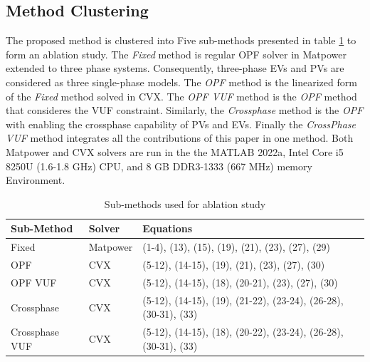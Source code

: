 \documentclass[journal]{IEEEtran}
\begin{document}
\subsection {Method Clustering}
The proposed method is clustered into Five sub-methods presented in  table \ref{table1} to form an ablation study. The \textit{Fixed} method is regular OPF solver in Matpower extended to three phase systems. Consequently, three-phase EVs and PVs are considered as three single-phase models. The \textit{OPF} method is the linearized form of the \textit{Fixed} method solved in CVX. The \textit{OPF VUF} method is the \textit{OPF} method that consideres the VUF constraint. Similarly, the \textit{Crossphase} method is the \textit{OPF} with enabling the crossphase capability of PVs and EVs. Finally the \textit{CrossPhase VUF} method integrates all the contributions of this paper in one method. 
Both Matpower and CVX solvers are run in the the MATLAB 2022a, Intel Core i5 8250U (1.6-1.8 GHz) CPU, and 8 GB DDR3-1333 (667 MHz) memory Environment.


\begin{center}
\begin{table}
\caption{Sub-methods used for ablation study}
\label{table1}
\begin{tabular}{| p{2cm} | p{1.5cm} | p{4cm} | }
    \hline 
\textbf{Sub-Method}  & \textbf{Solver} & \textbf{Equations}  \\
   \hline 
Fixed & Matpower & (1-4), (13), (15), (19), (21), (23), (27), (29)\\
   \hline
OPF   & CVX   & (5-12), (14-15), (19),  (21), (23), (27), (30)\\
    \hline
OPF VUF & CVX   & (5-12), (14-15), (18), (20-21), (23), (27), (30)\\
    \hline
Crossphase & CVX  & (5-12), (14-15), (19), (21-22), (23-24), (26-28), (30-31), (33)\\
    \hline
Crossphase VUF & CVX  & (5-12), (14-15), (18), (20-22), (23-24), (26-28), (30-31), (33)
\\
\hline
\end{tabular}
\end{table}
\end{center}
\end{document}

